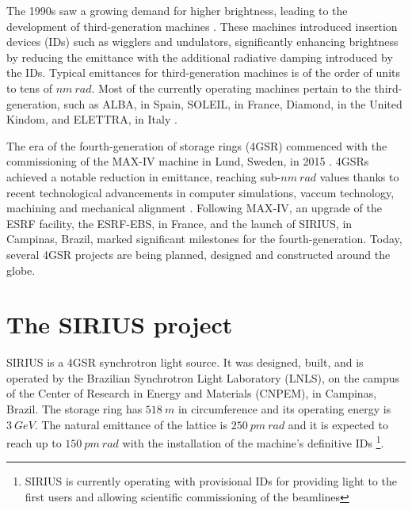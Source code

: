 The 1990s saw a growing demand for higher brightness, leading to the development of third-generation machines \cite{liu_towards_2017}. These machines introduced insertion devices (IDs) such as wigglers and undulators, significantly enhancing brightness by reducing the emittance with the additional radiative damping introduced by the IDs.
Typical emittances for third-generation machines is of the order of units to tens of $\unit{nm}~\unit{rad}$. Most of the currently operating machines pertain to the third-generation, such as ALBA, in Spain, SOLEIL, in France, Diamond, in the United Kindom, and ELETTRA, in Italy \cite{simoulin_synchrotron_2016}.

The era of the fourth-generation of storage rings (4GSR) commenced with the commissioning of the MAX-IV machine in Lund, Sweden, in 2015 \cite{liu_towards_2017,hettel_challenges_2014}. 4GSRs achieved a notable reduction in emittance, reaching sub-$\unit{nm}~\unit{rad}$ values thanks to recent technological advancements in computer simulations, vaccum technology, machining and mechanical alignment \cite{hettel_challenges_2014,liu_towards_2017}. Following MAX-IV, an upgrade of the ESRF facility, the ESRF-EBS, in France, and the launch of SIRIUS, in Campinas, Brazil, marked significant milestones for the fourth-generation. Today, several 4GSR projects are being planned, designed and constructed around the globe.

\section*{The SIRIUS project}

SIRIUS is a 4GSR synchrotron light source. It was designed, built, and is operated by the Brazilian Synchrotron Light Laboratory (LNLS), on the campus of the Center of Research in Energy and Materials (CNPEM), in Campinas, Brazil. The storage ring has $518~\unit{m}$ in circumference and its operating energy is $3~\unit{GeV}$. The natural emittance of the lattice is $250~\unit{pm}~\unit{rad}$ and it is expected to reach up to $150~\unit{pm}~\unit{rad}$ with the installation of the machine's definitive IDs \cite{liu_synchrotron_2019}\footnote{SIRIUS is currently operating with provisional IDs for providing light to the first users and allowing scientific commissioning of the beamlines}.

